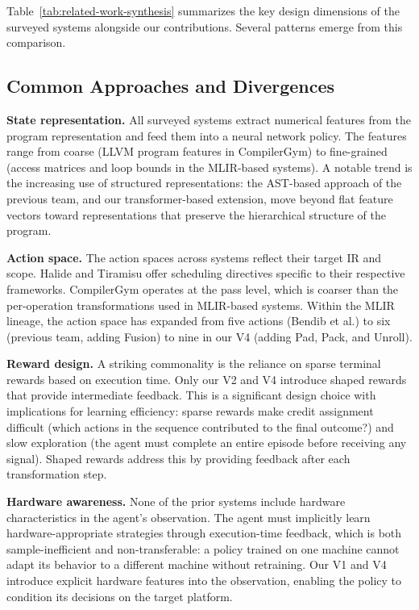 Table~\ref{tab:related-work-synthesis} summarizes the key design dimensions of the surveyed systems alongside our contributions. Several patterns emerge from this comparison.

\subsection{Common Approaches and Divergences}

\textbf{State representation.} All surveyed systems extract numerical features from the program representation and feed them into a neural network policy. The features range from coarse (LLVM program features in CompilerGym) to fine-grained (access matrices and loop bounds in the MLIR-based systems). A notable trend is the increasing use of structured representations: the AST-based approach of the previous team, and our transformer-based extension, move beyond flat feature vectors toward representations that preserve the hierarchical structure of the program.

\textbf{Action space.} The action spaces across systems reflect their target IR and scope. Halide and Tiramisu offer scheduling directives specific to their respective frameworks. CompilerGym operates at the pass level, which is coarser than the per-operation transformations used in MLIR-based systems. Within the MLIR lineage, the action space has expanded from five actions (Bendib et al.) to six (previous team, adding Fusion) to nine in our V4 (adding Pad, Pack, and Unroll).

\textbf{Reward design.} A striking commonality is the reliance on sparse terminal rewards based on execution time. Only our V2 and V4 introduce shaped rewards that provide intermediate feedback. This is a significant design choice with implications for learning efficiency: sparse rewards make credit assignment difficult (which actions in the sequence contributed to the final outcome?) and slow exploration (the agent must complete an entire episode before receiving any signal). Shaped rewards address this by providing feedback after each transformation step.

\textbf{Hardware awareness.} None of the prior systems include hardware characteristics in the agent's observation. The agent must implicitly learn hardware-appropriate strategies through execution-time feedback, which is both sample-inefficient and non-transferable: a policy trained on one machine cannot adapt its behavior to a different machine without retraining. Our V1 and V4 introduce explicit hardware features into the observation, enabling the policy to condition its decisions on the target platform.

